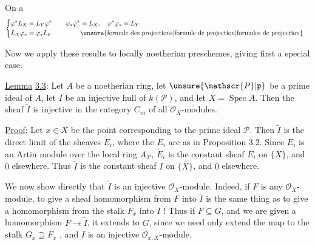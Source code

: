 On a
\[
\begin{aligned}
\left\{\begin{aligned}
\varphi^*L_X&=L_Y\varphi^*\\
L_X\varphi_*&=\varphi_*L_Y
\end{aligned}\right. \qquad&
\begin{aligned}
\varphi_*\varphi^*&=L_X,\quad\varphi^*\varphi_*=L_Y\\
&\text{\unsure{formule des projections|formule de projection|formules de projection}}
\end{aligned}
\end{aligned}
\]

Now we apply these results to locally noetherian preschemes, giving first a special case.

\uline{Lemma} \uline{3.3}: Let $A$ be a noetherian ring, let $\unsure{\mathscr{P}|\mathfrak{p}}$ be a prime ideal of $A$, let $I$ be an injective hull of $k(\mathscr{P})$, and let $X=\operatorname{Spec} A$. Then the sheaf $\widetilde{I}$ is injective in the category $C_m$ of all $\mathscr{O}_X$-modules.

\uline{Proof}: Let $x\in X$ be the point corresponding to the prime ideal $\mathscr{P}$. Then $\widetilde{I}$ is the direct limit of the sheaves $\widetilde{E}_i$, where the $E_i$ are as in Proposition 3.2. Since $E_i$ is an Artin module over the local ring $A_{\mathscr{P}}$, $\widetilde{E}_i$ is the constant sheaf $E_i$ on $\overline{\{X\}}$, and $0$ elsewhere. Thus $\widetilde{I}$ is the constant sheaf $I$ on $\overline{\{X\}}$, and $0$ elsewhere.

We now show directly that $\widetilde{I}$ is an injective $\mathscr{O}_X$-module. Indeed, if $F$ is any $\mathscr{O}_X$-module, to give a sheaf homomorphism from $F$ into $\widetilde{I}$ is the same thing as to give a homomorphism from the stalk $F_x$ into $I$ ! Thus if $F\subseteq G$, and we are given a homomorphism $F\longrightarrow\widetilde{I}$, it extends to $G$, since we need only extend the map to the stalk $G_x\supseteq F_x$ , and $I$ is an injective $\mathscr{O}_{x,X}$-module.

